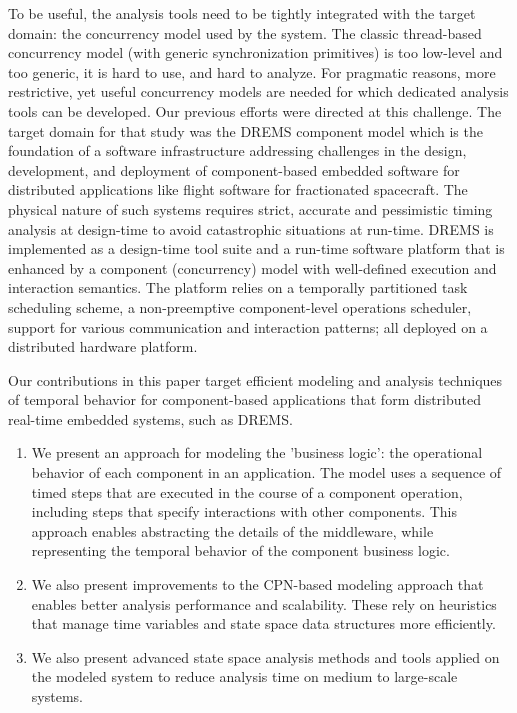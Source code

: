 To be useful, the analysis tools need to be tightly integrated with the target domain: the concurrency model used by the system. The classic thread-based concurrency model (with generic synchronization primitives) is too low-level and too generic, it is hard to use, and hard to analyze. For pragmatic reasons, more restrictive, yet useful concurrency models are needed for which dedicated analysis tools can be developed. Our previous efforts \cite{MoDeVVa} were directed at this challenge. The target domain for that study was the DREMS component model \cite{DREMS13Software} which is the foundation of a software infrastructure addressing challenges in the design, development, and deployment of component-based embedded software for distributed applications like flight software for fractionated spacecraft. The physical nature of such systems requires strict, accurate and pessimistic timing analysis at design-time to avoid catastrophic situations at run-time. DREMS is implemented as a design-time tool suite and a run-time software platform that is enhanced by a component (concurrency) model with well-defined execution and interaction semantics. The platform relies on a temporally partitioned task scheduling scheme, a non-preemptive component-level operations scheduler, support for various communication and interaction patterns; all deployed on a distributed hardware platform.

Our contributions in this paper target efficient modeling and analysis techniques of temporal behavior for component-based applications that form distributed real-time embedded systems, such as DREMS. 

\begin{enumerate}
	\item We present an approach for modeling  the 'business logic': the operational behavior of each component in an application. The model uses a sequence of timed steps that are executed in the course of a component operation, including steps that specify interactions with other components. This approach enables abstracting the details of the middleware, while representing the temporal behavior of the component business logic. 
	\item We also present improvements to the CPN-based modeling approach that enables better analysis performance and scalability. These rely on heuristics that manage time variables and state space data structures more efficiently. 
	\item We also present advanced state space analysis methods and tools applied on the modeled system to reduce analysis time on medium to large-scale systems.
\end{enumerate}

